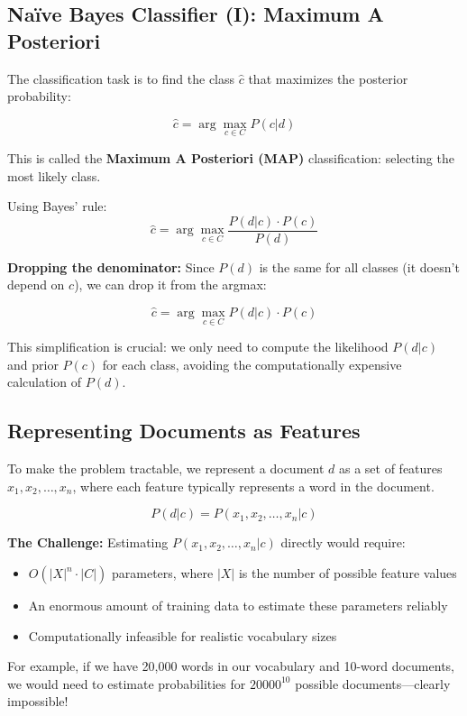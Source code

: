 \documentclass[11pt,a4paper]{article}
\theoremstyle{definition}
\theoremstyle{plain}
\theoremstyle{remark}
\begin{document}
\subsection{Naïve Bayes Classifier (I): Maximum A Posteriori}

The classification task is to find the class $\hat{c}$ that maximizes the posterior probability:

\[
\hat{c} = \arg\max_{c \in C} P(c|d)
\]

This is called the \textbf{Maximum A Posteriori (MAP)} classification: selecting the most likely class.

Using Bayes' rule:
\[
\hat{c} = \arg\max_{c \in C} \frac{P(d|c) \cdot P(c)}{P(d)}
\]

\textbf{Dropping the denominator:}
Since $P(d)$ is the same for all classes (it doesn't depend on $c$), we can drop it from the argmax:

\[
\hat{c} = \arg\max_{c \in C} P(d|c) \cdot P(c)
\]

This simplification is crucial: we only need to compute the likelihood $P(d|c)$ and prior $P(c)$ for each class, avoiding the computationally expensive calculation of $P(d)$.

\subsection{Representing Documents as Features}

To make the problem tractable, we represent a document $d$ as a set of features $x_1, x_2, \ldots, x_n$, where each feature typically represents a word in the document.

\[
P(d|c) = P(x_1, x_2, \ldots, x_n | c)
\]

\textbf{The Challenge:}
Estimating $P(x_1, x_2, \ldots, x_n | c)$ directly would require:
\begin{itemize}
    \item $O(|X|^n \cdot |C|)$ parameters, where $|X|$ is the number of possible feature values
    \item An enormous amount of training data to estimate these parameters reliably
    \item Computationally infeasible for realistic vocabulary sizes
\end{itemize}

For example, if we have 20,000 words in our vocabulary and 10-word documents, we would need to estimate probabilities for $20000^{10}$ possible documents—clearly impossible!
\end{document}

